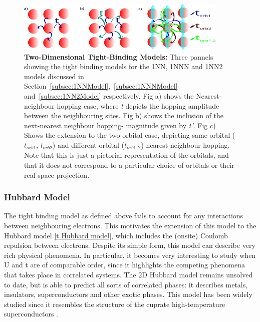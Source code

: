 \documentclass[12pt]{article}
\begin{document}
\begin{figure}[htbp]  %
    \centering
    \includegraphics[width=0.9\textwidth]{2Dhubbardmodel.png}  %
    \caption{\textbf{Two-Dimensional Tight-Binding Models:} Three pannels showing the tight binding models for the 1NN, 1NNN and 1NN2 models discussed in Section~\ref{subsec:1NNModel},~\ref{subsec:1NNNModel} and~\ref{subsec:1NN2Model} respectively. Fig a) shows the Nearest-neighbour hopping case, where \textit{t} depicts the hopping amplitude between the neighbouring sites. Fig b) shows the inclusion of the next-nearest neighbour hopping- magnitude given by \textit{t'}.
    Fig c) Shows the extension to the two-orbital case, depicting  same orbital ($t_{orb1}$, $t_{orb2}$) and different orbital ($t_{orb1,2}$) nearest-neighbour hopping. Note that this is just a pictorial representation of the orbitals, and that it does not correspond to a particular choice of orbitals or their real space projection. }
    \label{fig:2D Hubbard model}
\end{figure}

\newpage

\subsubsection{Hubbard Model}
\label{subsec: HubbardModel}

The  tight binding model as defined above fails to account for any interactions between neighbouring electrons. This motivates the extension of this model to the Hubbard model \eqref{t Hubbard model}, which includes the (onsite) Coulomb repulsion between electrons. Despite its simple form, this model can describe very rich physical phenomena.
In particular, it becomes very interesting to study when U and t are of comparable order, since it highlights the competing phenomena that takes place in correlated systems. 
The 2D Hubbard model remains unsolved to date, but is able to predict all sorts of correlated phases: it describes metals, insulators, superconductors and other exotic phases\cite{white1989numerical,hirsch1985two, anderson1990luttinger,sun2011nearly}. 
This model has been widely studied since it resembles the structure of the cuprate high-temperature superconductors \cite{dagotto1994correlated}. 
\end{document}

